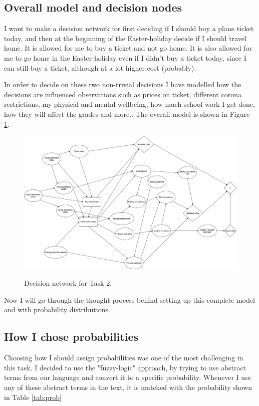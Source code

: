 \documentclass[11pt, a4paper, english]{../Template/NTNUoving}
\begin{document}
\begin{oppgave}

    \section{Overall model and decision nodes}
    I want to make a decision network for first deciding if I should buy a plane ticket today, and then at the beginning of
    the Easter-holiday decide if I should travel home. It is allowed for me to buy a ticket and not go home. It is also allowed for me
    to go home in the Easter-holiday even if I didn't buy a ticket today, since I can still buy a ticket, although at a lot higher cost (probably).

    In order to decide on these two non-trivial decisions I have modelled how the decisions are influenced observations such as prices on ticket, different corona restrictions, my physical and mental wellbeing,
    how much school work I get done, how they will affect the grades and more.. The overall model is shown in Figure \ref{fig:2}.

    \begin{figure}[H]
        \centering
        \includegraphics[width=\textwidth]{Task3_2.png}
        \label{fig:2}
        \caption{Decision network for Task 2.}
    \end{figure}

    Now I will go through the thought process behind setting up this complete model and with probability distributions.

    \subsection{How I chose probabilities}
    Choosing how I should assign probabilities was one of the most challenging in this task.
    I decided to use the "fuzzy-logic" approach, by trying to use abstract terms from our language and convert it to a specific
    probability. Whenever I use any of these abstract terms in the text, it is matched with the probability shown
    in Table \ref{tab:prob}


\end{oppgave}
\end{document}
